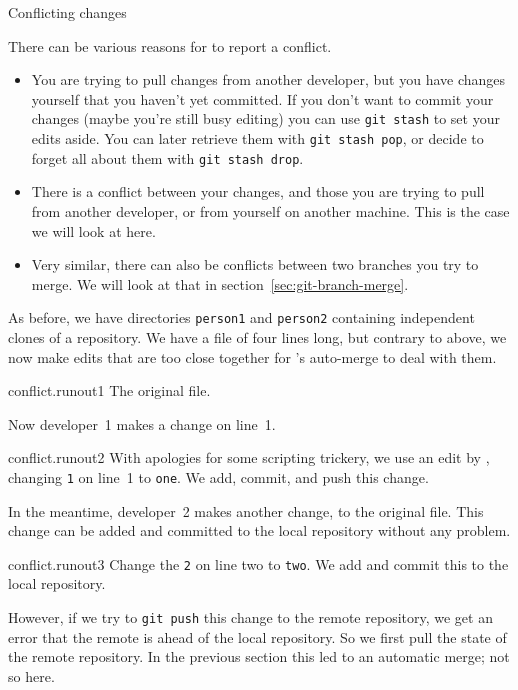 \newpage
{} {Conflicting changes}
\label{sec:git-conflict}

There can be various reasons for  to report a conflict.
\begin{itemize}
\item You are trying to pull changes from another developer, but you have changes
  yourself that you haven't yet committed.
  If you don't want to commit your changes
  (maybe you're still busy editing)
  you can use \lstinline{git stash} to set your edits aside.
  You can later retrieve them with \lstinline{git stash pop},
  or decide to forget all about them with \lstinline{git stash drop}.
\item There is a conflict between your changes, and those you are trying to pull
  from another developer, or from yourself on another machine.
  This is the case we will look at here.
\item Very similar, there can also be conflicts between two branches you try to merge.
  We will look at that in section~\ref{sec:git-branch-merge}.
\end{itemize}

As before, we have directories \lstinline{person1} and \lstinline{person2}
containing independent clones of a repository.
We have a file of four lines long, but contrary to above,
we now make edits that are too close together for 's
auto-merge to deal with them.

\begin{gitstep}{conflict.runout1}
  The original file.
\end{gitstep}

Now developer~1 makes a change on line~1.

\begin{gitstep}{conflict.runout2}
  With apologies for some scripting trickery,
  we use an edit by , changing \lstinline{1} on line~1 to \lstinline{one}.
  We add, commit, and push this change.
\end{gitstep}

In the meantime, developer~2 makes another change, to the original file.
This change can be added and committed to the local repository
without any problem.

\begin{gitstep}{conflict.runout3}
  Change the \lstinline{2} on line two to \lstinline{two}.
  We add and commit this to the local repository.
\end{gitstep}

However, if we try to \lstinline{git push} this change to the remote repository,
we get an error that the remote is ahead of the local repository.
So we first pull the state of the remote repository.
In the previous section this led to an automatic merge;
not so here.


